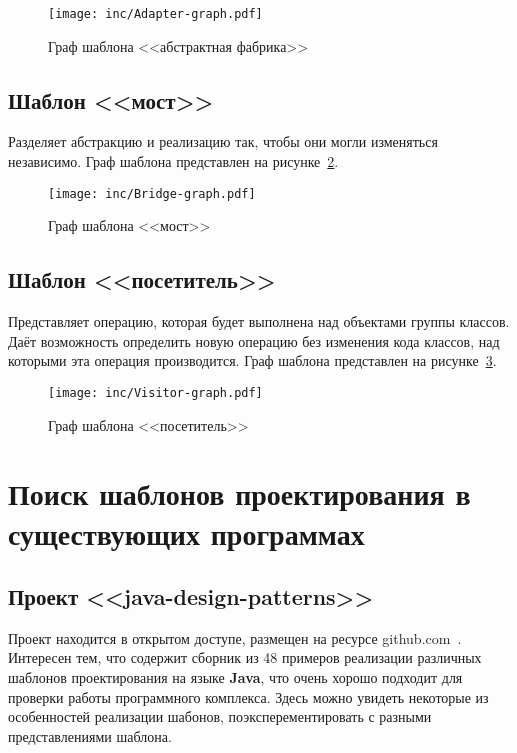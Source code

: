 \begin{figure}[!ht]
\centering
\texttt{[image: inc/Adapter-graph.pdf]}
\caption{Граф шаблона <<абстрактная фабрика>>}
\label{fig:Adapter-graph}
\end{figure}

\subsection{Шаблон <<мост>>}

Разделяет абстракцию и реализацию так, чтобы они могли изменяться независимо.
Граф шаблона представлен на рисунке~\ref{fig:Bridge-graph}.

\begin{figure}[!ht]
\centering
\texttt{[image: inc/Bridge-graph.pdf]}
\caption{Граф шаблона <<мост>>}
\label{fig:Bridge-graph}
\end{figure}

\subsection{Шаблон <<посетитель>>}

Представляет операцию, которая будет выполнена над объектами группы классов.
Даёт возможность определить новую операцию без изменения кода классов,
над которыми эта операция производится.
Граф шаблона представлен на рисунке~\ref{fig:Visitor-graph}.

\begin{figure}[!ht]
\centering
\texttt{[image: inc/Visitor-graph.pdf]}
\caption{Граф шаблона <<посетитель>>}
\label{fig:Visitor-graph}
\end{figure}

\section{Поиск шаблонов проектирования в существующих программах}

\subsection{Проект <<java-design-patterns>>}

Проект находится в открытом доступе, размещен на ресурсе
github.com~\cite{java-design-patterns}.
Интересен тем, что содержит сборник из 48 примеров реализации различных
шаблонов проектирования на языке \textbf{Java},
что очень хорошо подходит для проверки работы программного комплекса.
Здесь можно увидеть некоторые из особенностей реализации шабонов,
поэксперементировать с разными представлениями шаблона.


